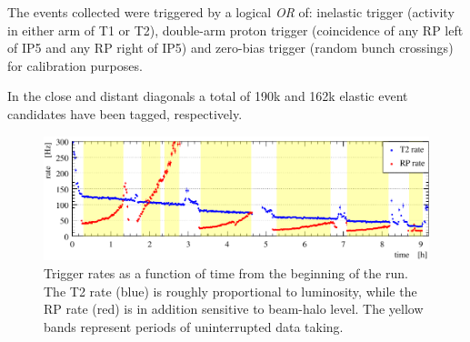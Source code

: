 The events collected were triggered by a logical \textit{OR} of: inelastic 
trigger (activity in either arm of T1 or T2), double-arm proton trigger 
(coincidence of any RP left of IP5 and any RP right of IP5) and zero-bias trigger (random bunch crossings) for calibration purposes.

In the close and distant diagonals a total of 190k and 162k elastic event candidates have been tagged, respectively.


\begin{figure}
\begin{center}
\includegraphics{fig/trigger_rate.pdf}
\vskip-3mm
\caption{%
Trigger rates as a function of time from the beginning of the run. The T2 rate (blue) is roughly proportional to luminosity, while the RP rate (red) is in addition sensitive to beam-halo level. The yellow bands represent periods of uninterrupted data taking.
}
\label{fig:overview}
\end{center}
\end{figure}
